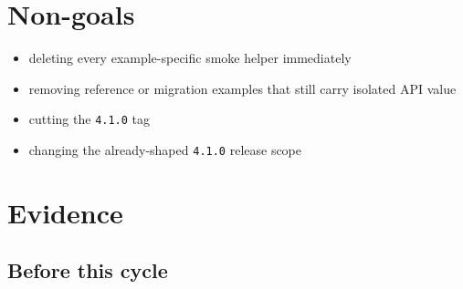 \section{Non-goals}\label{record-201-non-goals}

\begin{itemize}
\tightlist
\item
  deleting every example-specific smoke helper immediately
\item
  removing reference or migration examples that still carry isolated API value
\item
  cutting the \texttt{4\allowbreak{}.\allowbreak{}1\allowbreak{}.\allowbreak{}0} tag
\item
  changing the already-shaped \texttt{4\allowbreak{}.\allowbreak{}1\allowbreak{}.\allowbreak{}0} release scope
\end{itemize}

\section{Evidence}\label{record-201-evidence}

\subsection{Before this cycle}\label{record-201-before-this-cycle}

